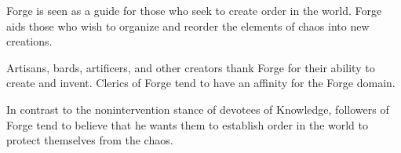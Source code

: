 Forge is seen as a guide for those who seek to create order in the world.
Forge aids those who wish to organize and reorder the elements of chaos into new creations.

Artisans, bards, artificers, and other creators thank Forge for their ability to create and invent.
Clerics of Forge tend to have an affinity for the Forge domain.

In contrast to the nonintervention stance of devotees of Knowledge, followers of Forge tend to believe that he wants them to establish order in the world to protect themselves from the chaos.
